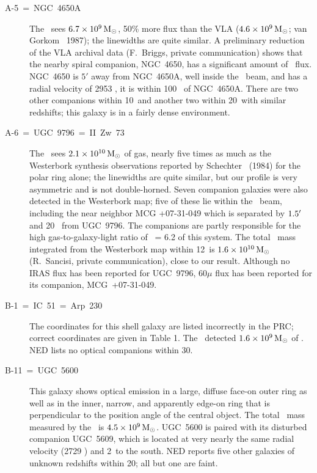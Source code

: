 \begin{description}
\item[A-5~=~NGC~4650A] 
The \ sees $6.7 \times 10^9 {\,{\rm M}_\odot}$, 
50\% more flux than the VLA ($4.6 \times 10^9 {\,{\rm M}_\odot}$; van Gorkom \etal\ 
1987); the linewidths are quite similar.  A preliminary
reduction of the VLA archival data (F.~Briggs, private communication)
shows that the nearby spiral companion, NGC~4650, has a 
significant amount of \HI\ flux.  NGC~4650 is $5'$ away from
NGC~4650A, well inside the \ beam, and has a radial velocity of 2953
\KMS, \ie it is within 100 \KMS\ of NGC~4650A.  There are two other
companions within 10\AMIN\ and another two within 20\AMIN\ with 
similar redshifts; this galaxy is in a fairly dense environment.

\item[A-6~=~UGC~9796~=~II~Zw~73] 
The \ sees $2.1 \times 10^{10} {\,{\rm M}_\odot}$
of gas, nearly five times as much as the Westerbork synthesis
observations reported by Schechter \etal\ (1984) for the polar ring alone; 
the linewidths are quite 
similar, but our profile is very asymmetric and is not double-horned.  
Seven companion galaxies were also detected in the Westerbork map;
five of these lie within the \GB140\ beam, including the near neighbor 
MCG +07-31-049 which is separated by $1.5{^{\rm \prime}}$ and 20 \KMS\ from UGC~9796.  
The companions are partly responsible for the high gas-to-galaxy-light ratio of 
\MHILB\ = 6.2 of this system.  
The total \HI\ mass integrated from the Westerbork map within 12\AMIN\ is 
$1.6 \times 10^{10} {\,{\rm M}_\odot}$ (R.~Sancisi, private communication), 
close to our result.  
Although no IRAS flux has been reported for UGC~9796, $60\mu$ flux has been 
reported for its companion, MCG~+07-31-049.

\item[B-1~=~IC~51~=~Arp~230] 
The coordinates for this shell galaxy are listed
incorrectly in the PRC; correct coordinates are given in Table 1.
The \GB140\ detected $1.6 \times 10^9 {\,{\rm M}_\odot}$ of \HI.
NED lists no optical companions within 30\AMIN.

\item[B-11~=~UGC~5600] 
This galaxy shows optical emission in a large, diffuse 
face-on outer ring as well as in the inner, narrow, and 
apparently edge-on ring that is perpendicular to the position angle 
of the central object.  The total \HI\
mass measured by the \GB140\ is $4.5 \times 10^9 {\,{\rm M}_\odot}$.  
UGC~5600 is paired with its disturbed companion UGC~5609, which is 
located at very nearly the same radial velocity (2729 \KMS) and 2\AMIN\ 
to the south.  NED reports five other galaxies of unknown redshifts 
within 20\AMIN; all but one are faint.


\end{description}
